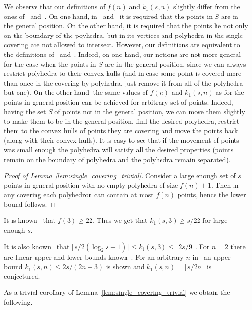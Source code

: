 \documentclass[11pt]{article}
\begin{document}
\begin{remark}
We observe that our definitions of $f(n)$ and $k_1(s,n)$ slightly differ from the ones of~\cite{Valtr92} and~\cite{BMP05book}. On one hand, in~\cite{Valtr92} and~\cite{BMP05book} it is required that the points in $S$ are in the general position. On the other hand, it is required that the points lie not only on the boundary of the poyhedra, but in its vertices and polyhedra in the single covering are not allowed to intersect. However, our definitions are equivalent to the definitions of~\cite{Valtr92} and~\cite{BMP05book}. Indeed, on one hand, our notions are not more general for the case when the points in $S$ are in the general position, since we can always restrict polyhedra to their convex hulls (and in case some point is covered more than once in the covering by polyhedra, just remove it from all of the polyhedra but one). On the other hand, the same values of $f(n)$ and $k_1(s,n)$ as for the points in general position can be achieved for arbitrary set of points. Indeed, having the set $S$ of points not in the general position, we can move them slightly to make them to be in the general position, find the desired polyhedra, restrict them to the convex hulls of points they are covering and move the points back (along with their convex hulls). It is easy to see that if the movement of points was small enough the polyhedra will satisfy all the desired properties (points remain on the boundary of polyhedra and the polyhedra remain separated).
\end{remark}

\begin{proof}[Proof of Lemma~\ref{lem:single_covering_trivial}]
Consider a large enough set of $s$ points in general position with no empty polyhedra of size $f(n)+1$. Then in any covering each polyhedron can contain at most $f(n)$ points, hence the lower bound follows.
\end{proof}

It is known~\cite{Valtr92} that $f(3)\geq 22$. Thus we get that $k_1(s,3) \geq s/22$ for large enough $s$.

It is also known~\cite{Urabe99} that $\lceil s/2(\log_2 s +1) \rceil \leq k_1(s,3) \leq \lceil 2s/9 \rceil$. For $n=2$ there are linear upper and lower bounds known~\cite{Urabe96}. For an arbitrary $n$ in~\cite{Urabe99} an upper bound $k_1(s,n) \leq 2s/(2n+3)$ is shown and $k_1(s,n) = \lceil s/2n\rceil$ is conjectured.

As a trivial corollary of Lemma~\ref{lem:single_covering_trivial} we obtain the following.
\end{document}
